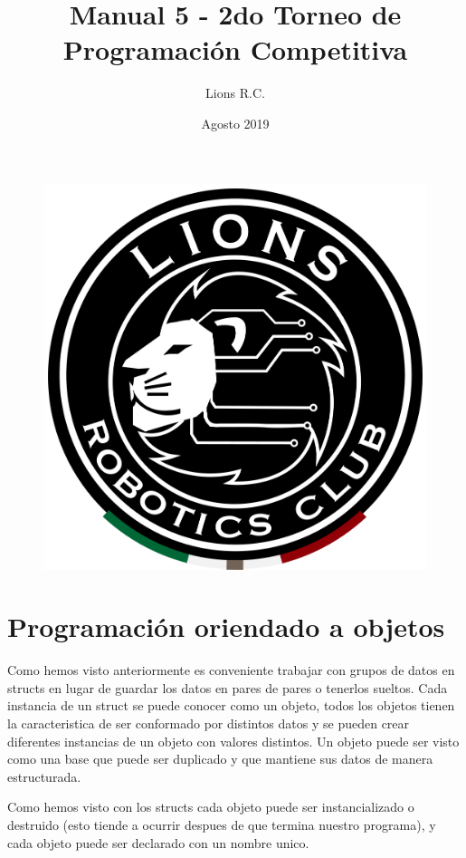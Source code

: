 \documentclass{article}
\title{Manual 5 - 2do Torneo de Programación Competitiva}
\author{Lions R.C.}
\date{Agosto 2019}
\begin{document}
\maketitle

\tableofcontents

\begin{figure}[H]
    \centering
    \includegraphics[width=0.2\paperwidth]{newblack}
\end{figure}

\section{Programación oriendado a objetos}

Como hemos visto anteriormente es conveniente trabajar con grupos de datos en structs en lugar de guardar los datos en pares de pares o tenerlos sueltos. Cada instancia de un struct se puede conocer como un objeto, todos los objetos tienen la caracteristica de ser conformado por distintos datos y se pueden crear diferentes instancias de un objeto con valores distintos. Un objeto puede ser visto como una base que puede ser duplicado y que mantiene sus datos de manera estructurada.

Como hemos visto con los structs cada objeto puede ser instancializado o destruido (esto tiende a ocurrir despues de que termina nuestro programa), y cada objeto puede ser declarado con un nombre unico.
\end{document}

